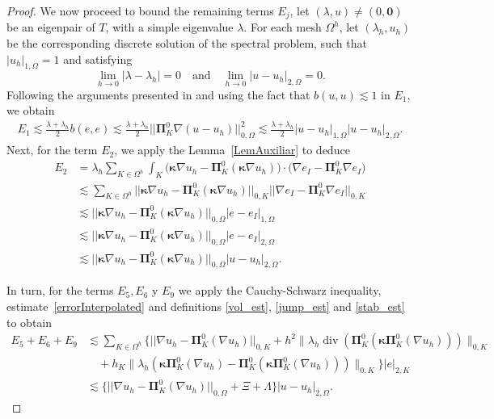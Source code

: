 \documentclass[final,reqno]{elsarticle}
\newcommand\vdiv{\mathop{\mathrm{div}}\nolimits}
\newcommand{\norm}[1]{\|#1\|}
\def\bkappa{\boldsymbol{\kappa}}
\def\bPi{\mathbf{\Pi}}
\begin{document}
\begin{proof}
We now proceed to bound the remaining terms $E_j$, let $(\lambda,u)\neq (0,\mathbf{0})$ be an eigenpair of $T$, with a simple eigenvalue $\lambda$. For each mesh $\Omega^h$, let $(\lambda_h,u_h)$ be the corresponding discrete solution of the spectral problem, such that $|u_h|_{1,\Omega}=1$ and satisfying
\[
\lim_{h\to 0} |\lambda-\lambda_h| = 0
\quad\text{and}\quad
\lim_{h\to 0} |u-u_h|_{2,\Omega} = 0.
\]
Following the arguments presented in \cite{dassi2025posteriorierrorestimatesc1} and using the fact that $b(u,u)\lesssim 1$ in $E_1$, we obtain
\begin{align}
    E_1\lesssim \frac{\lambda+\lambda_h}{2}b(e,e)\lesssim \frac{\lambda+\lambda_h}{2} ||\bPi_K^0 \nabla (u-u_h) ||_{0,\Omega}^2\lesssim  \frac{\lambda+\lambda_h}{2} |u-u_h|_{1,\Omega}|u-u_h|_{2,\Omega}\label{cotaE1}.
\end{align}
Next, for the term $E_2$, we apply the Lemma~\ref{LemAuxiliar} to deduce
\begin{align}
    E_2 & = \lambda_h \sum\limits_{K\in \Omega^h} \int_K  \Big(\bkappa \nabla u_h-\bPi_K^0(\bkappa \nabla u_h) \Big)\cdot\Big( \nabla e_I - \bPi_K^0 \nabla e_I \Big)    \nonumber\\
    &\lesssim \sum\limits_{K\in \Omega^h} ||\bkappa \nabla u_h-\bPi_K^0(\bkappa \nabla u_h)||_{0,K} ||  \nabla e_I - \bPi_K^0 \nabla e_I||_{0,K}\nonumber\\
    &\lesssim   ||\bkappa \nabla u_h-\bPi_K^0(\bkappa \nabla u_h)||_{0,\Omega} |e-e_I|_{1,\Omega} \nonumber \\%
    &\lesssim  ||\bkappa \nabla u_h-\bPi_K^0(\bkappa \nabla u_h)||_{0,\Omega} |e-e_I|_{2,\Omega} \nonumber\\
    &\lesssim %
    ||\bkappa \nabla u_h-\bPi_K^0(\bkappa \nabla u_h)||_{0,\Omega} |u-u_h|_{2,\Omega}.
    \label{cotaE2}
\end{align}

In turn, for the terms $E_5, E_6$ y $E_9$ we apply the Cauchy-Schwarz inequality, estimate~\eqref{errorInterpolated} and definitions \eqref{vol_est}, \eqref{jump_est} and  \eqref{stab_est}  to obtain 
\begin{align}
   E_5+E_6+E_9
&\lesssim \sum\limits_{K\in \Omega^h}\Big\{ ||\nabla u_h -\bPi_K^0(\nabla u_h) ||_{0,K} + h^2\norm{\lambda_h \vdiv\left(\bPi_K^0(\bkappa \bPi_K^0(\nabla u_h))\right)}_{0,K}\nonumber\\
   &\quad + h_K \norm{\lambda_h \left(\bkappa \bPi_K^0(\nabla u_h)-\bPi_K^0(\bkappa \bPi_K^0(\nabla u_h))\right)}_{0,K} \Big\}|e|_{2,K}\nonumber\\
   &\lesssim \Big\{ ||\nabla u_h -\bPi_K^0(\nabla u_h) ||_{0,\Omega}  + \Xi + \Lambda  \Big\}|u-u_h|_{2,\Omega}.\label{cotasE5E6E9}
\end{align}


\end{proof}
\end{document}

